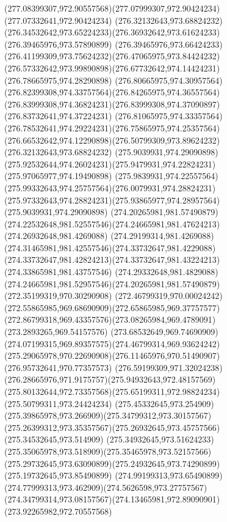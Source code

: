 {{  \curveto(277.08399307,972.90557568)(277.07999307,972.90424234)(277.07332641,972.90424234)
  \moveto(276.32132643,973.68824232)
  \curveto(276.34532642,973.65224233)(276.36932642,973.61624233)(276.39465976,973.57890899)
  \curveto(276.39465976,973.66424233)(276.41199309,973.75624232)(276.47065975,973.84424232)
  \curveto(276.57332642,973.99890898)(276.67732642,974.14424231)(276.78665975,974.28290898)
  \curveto(276.80665975,974.30957564)(276.82399308,974.33757564)(276.84265975,974.36557564)
  \curveto(276.83999308,974.36824231)(276.83999308,974.37090897)(276.83732641,974.37224231)
  \curveto(276.81065975,974.33357564)(276.78532641,974.29224231)(276.75865975,974.25357564)
  \curveto(276.66532642,974.12290898)(276.50799309,973.89624232)(276.32132643,973.68824232)
  \moveto(275.9039931,974.29090898)
  \curveto(275.92532644,974.26024231)(275.9479931,974.22824231)(275.97065977,974.19490898)
  \curveto(275.9839931,974.22557564)(275.99332643,974.25757564)(276.0079931,974.28824231)
  \curveto(275.97332643,974.28824231)(275.93865977,974.28957564)(275.9039931,974.29090898)
  \moveto(274.20265981,981.57490879)
  \curveto(274.22532648,981.52557546)(274.24665981,981.47624213)(274.26932648,981.4269088)
  \curveto(274.29199314,981.4269088)(274.31465981,981.42557546)(274.33732647,981.4229088)
  \curveto(274.33732647,981.42824213)(274.33732647,981.43224213)(274.33865981,981.43757546)
  \curveto(274.29332648,981.4829088)(274.24665981,981.52957546)(274.20265981,981.57490879)
  \moveto(272.35199319,970.30290908)
  \curveto(272.46799319,970.00024242)(272.55865985,969.68690909)(272.65865985,969.37757577)
  \curveto(272.86799318,969.43357576)(273.08265984,969.4789091)(273.2893265,969.54157576)
  \curveto(273.68532649,969.74690909)(274.07199315,969.89357575)(274.46799314,969.93624242)
  \curveto(275.29065978,970.22690908)(276.11465976,970.51490907)(276.95732641,970.77357573)
  \curveto(276.59199309,971.32024238)(276.28665976,971.9175757)(275.94932643,972.48157569)
  \curveto(275.80132644,972.73357568)(275.65199311,972.98824234)(275.50799311,973.24424234)
  \curveto(275.45332645,973.254909)(275.39865978,973.266909)(275.34799312,973.30157567)
  \curveto(275.26399312,973.35357567)(275.26932645,973.45757566)(275.34532645,973.514909)
  \curveto(275.34932645,973.51624233)(275.35065978,973.518909)(275.35465978,973.52157566)
  \curveto(275.29732645,973.63090899)(275.24932645,973.74290899)(275.19732645,973.85490899)
  \curveto(274.99199313,973.65490899)(274.77999313,973.462909)(274.5626598,973.27757567)
  \curveto(274.34799314,973.08157567)(274.13465981,972.89090901)(273.92265982,972.70557568)
}}
